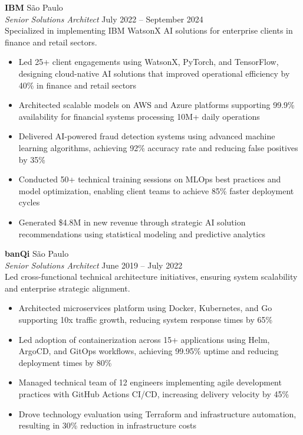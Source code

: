\documentclass[a4paper]{article}
\begin{document}
\textbf{IBM}                                                      \hfill São Paulo              \\
\textit{Senior Solutions Architect}                               \hfill July 2022 – September 2024    \\
\vspace{0.5mm}
Specialized in implementing IBM WatsonX AI solutions for enterprise clients in finance and retail sectors.
\vspace{-2mm}
\begin{itemize}
\setlength\itemsep{-1mm}
\item Led 25+ client engagements using WatsonX, PyTorch, and TensorFlow, designing cloud-native AI solutions that improved operational efficiency by 40\% in finance and retail sectors
\item Architected scalable models on AWS and Azure platforms supporting 99.9\% availability for financial systems processing 10M+ daily operations
\item Delivered AI-powered fraud detection systems using advanced machine learning algorithms, achieving 92\% accuracy rate and reducing false positives by 35\%
\item Conducted 50+ technical training sessions on MLOps best practices and model optimization, enabling client teams to achieve 85\% faster deployment cycles
\item Generated \$4.8M in new revenue through strategic AI solution recommendations using statistical modeling and predictive analytics
\end{itemize}
\vspace{0.5mm}

\textbf{banQi}                                 \hfill São Paulo             \\
\textit{Senior Solutions Architect}            \hfill June 2019 – July 2022   \\
\vspace{0.5mm}
Led cross-functional technical architecture initiatives, ensuring system scalability and enterprise strategic alignment.
\vspace{-2mm} 
\begin{itemize}
\setlength\itemsep{-1mm}
\item Architected microservices platform using Docker, Kubernetes, and Go supporting 10x traffic growth, reducing system response times by 65\%
\item Led adoption of containerization across 15+ applications using Helm, ArgoCD, and GitOps workflows, achieving 99.95\% uptime and reducing deployment times by 80\%
\item Managed technical team of 12 engineers implementing agile development practices with GitHub Actions CI/CD, increasing delivery velocity by 45\%
\item Drove technology evaluation using Terraform and infrastructure automation, resulting in 30\% reduction in infrastructure costs
\end{itemize}
\vspace{0.5mm}
\end{document}
